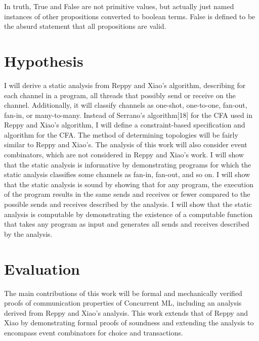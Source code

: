 In truth, True and False are not primitive values, but actually just named instances of other
propositions converted to boolean terms.   False is defined to be the absurd statement that all
propositions are valid.


\section{Hypothesis}
I will derive a static analysis from Reppy and Xiao's algorithm, describing for each channel in
a program, all threads that possibly send or receive on the channel.  Additionally, it will
classify channels as one-shot, one-to-one, fan-out, fan-in, or many-to-many.  Instead of
Serrano's algorithm[18] for the CFA used in Reppy and Xiao's algorithm, I will define a
constraint-based specification and algorithm for the CFA.  The method of determining topologies
will be fairly similar to Reppy and Xiao's.  The analysis of this work will also consider event
combinators, which are not considered in Reppy and Xiao's work.  I will show that the static
analysis is informative by demonstrating programs for which the static analysis classifies some
channels as fan-in, fan-out, and so on.  I will show that the static analysis is sound by
showing that for any program, the execution of the program results in the same sends and
receives or fewer compared to the possible sends and receives described by the analysis.  I
will show that the static analysis is computable by demonstrating the existence of a
computable function that takes any program as input and generates all sends and receives
described by the analysis.


\section{Evaluation}
The main contributions of this work will be formal and mechanically verified proofs of
communication properties of Concurrent ML, including an analysis derived from Reppy and Xiao's
analysis.  This work extends that of Reppy and Xiao by demonstrating formal proofs of soundness
and extending the analysis to encompass event combinators for choice and transactions.


